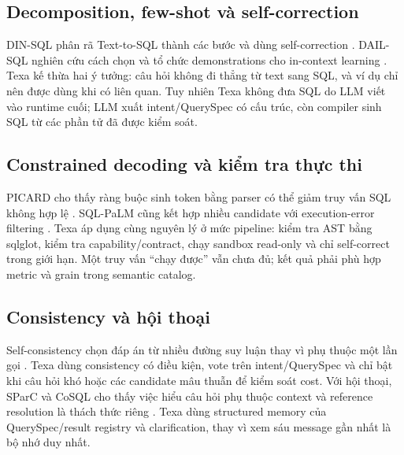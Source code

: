 \documentclass[11pt,a4paper]{article}
\begin{document}
\subsection{Decomposition, few-shot và self-correction}
DIN-SQL phân rã Text-to-SQL thành các bước và dùng self-correction \cite{pourreza2023dinsql}. DAIL-SQL nghiên cứu cách chọn và tổ chức demonstrations cho in-context learning \cite{gao2024dailsql}. Texa kế thừa hai ý tưởng: câu hỏi không đi thẳng từ text sang SQL, và ví dụ chỉ nên được dùng khi có liên quan. Tuy nhiên Texa không đưa SQL do LLM viết vào runtime cuối; LLM xuất intent/QuerySpec có cấu trúc, còn compiler sinh SQL từ các phần tử đã được kiểm soát.
\subsection{Constrained decoding và kiểm tra thực thi}
PICARD cho thấy ràng buộc sinh token bằng parser có thể giảm truy vấn SQL không hợp lệ \cite{scholak2021picard}. SQL-PaLM cũng kết hợp nhiều candidate với execution-error filtering \cite{sqlpalm2023}. Texa áp dụng cùng nguyên lý ở mức pipeline: kiểm tra AST bằng sqlglot, kiểm tra capability/contract, chạy sandbox read-only và chỉ self-correct trong giới hạn. Một truy vấn ``chạy được'' vẫn chưa đủ; kết quả phải phù hợp metric và grain trong semantic catalog.
\subsection{Consistency và hội thoại}
Self-consistency chọn đáp án từ nhiều đường suy luận thay vì phụ thuộc một lần gọi \cite{wang2023selfconsistency}. Texa dùng consistency có điều kiện, vote trên intent/QuerySpec và chỉ bật khi câu hỏi khó hoặc các candidate mâu thuẫn để kiểm soát cost. Với hội thoại, SParC và CoSQL cho thấy việc hiểu câu hỏi phụ thuộc context và reference resolution là thách thức riêng \cite{yu2019sparc,yu2019cosql}. Texa dùng structured memory của QuerySpec/result registry và clarification, thay vì xem sáu message gần nhất là bộ nhớ duy nhất.
\end{document}
